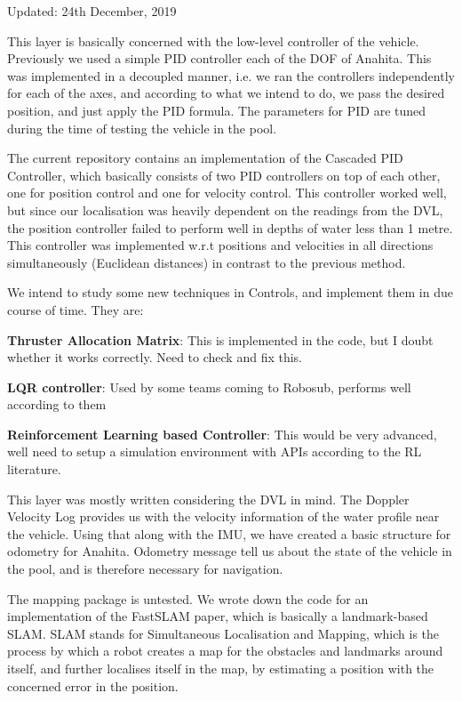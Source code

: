 Updated\+: 24th December, 2019

This layer is basically concerned with the low-\/level controller of the vehicle. Previously we used a simple P\+ID controller each of the D\+OF of Anahita. This was implemented in a decoupled manner, i.\+e. we ran the controllers independently for each of the axes, and according to what we intend to do, we pass the desired position, and just apply the P\+ID formula. The parameters for P\+ID are tuned during the time of testing the vehicle in the pool.

The current repository contains an implementation of the Cascaded P\+ID Controller, which basically consists of two P\+ID controllers on top of each other, one for position control and one for velocity control. This controller worked well, but since our localisation was heavily dependent on the readings from the D\+VL, the position controller failed to perform well in depths of water less than 1 metre. This controller was implemented w.\+r.\+t positions and velocities in all directions simultaneously (Euclidean distances) in contrast to the previous method.

We intend to study some new techniques in Controls, and implement them in due course of time. They are\+:


\begin{DoxyItemize}
\item {\bfseries Thruster Allocation Matrix}\+: This is implemented in the code, but I doubt whether it works correctly. Need to check and fix this.
\item {\bfseries L\+QR controller}\+: Used by some teams coming to Robosub, performs well according to them
\item {\bfseries Reinforcement Learning based Controller}\+: This would be very advanced, we\textquotesingle{}ll need to setup a simulation environment with A\+P\+Is according to the RL literature.
\end{DoxyItemize}

This layer was mostly written considering the D\+VL in mind. The Doppler Velocity Log provides us with the velocity information of the water profile near the vehicle. Using that along with the I\+MU, we have created a basic structure for odometry for Anahita. Odometry message tell us about the state of the vehicle in the pool, and is therefore necessary for navigation.

The mapping package is untested. We wrote down the code for an implementation of the Fast\+S\+L\+AM paper, which is basically a landmark-\/based S\+L\+AM. S\+L\+AM stands for Simultaneous Localisation and Mapping, which is the process by which a robot creates a map for the obstacles and landmarks around itself, and further localises itself in the map, by estimating a position with the concerned error in the position.



